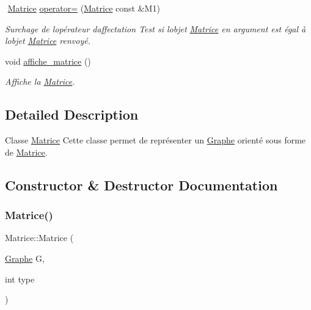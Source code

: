 \begin{DoxyCompactItemize}
$$\mbox{\label{classMatrice_a7cad6679749d80d4aa3771bd3864aeb8}} 
\hyperlink{classMatrice}{Matrice} \hyperlink{classMatrice_a7cad6679749d80d4aa3771bd3864aeb8}{operator=} (\hyperlink{classMatrice}{Matrice} const \&M1)
\begin{DoxyCompactList}\small\item\em Surchage de l\textquotesingle{}op\'{e}rateur d\textquotesingle{}affectation Test si l\textquotesingle{}objet \hyperlink{classMatrice}{Matrice} en argument est \'{e}gal \`{a} l\textquotesingle{}objet \hyperlink{classMatrice}{Matrice} renvoy\'{e}. \end{DoxyCompactList}\item 
\mbox{\label{classMatrice_a8d927d4f8245a16985e3cec9a1b46d8d}} 
void \hyperlink{classMatrice_a8d927d4f8245a16985e3cec9a1b46d8d}{affiche\+\_\+matrice} ()
\begin{DoxyCompactList}\small\item\em Affiche la \hyperlink{classMatrice}{Matrice}. \end{DoxyCompactList}\end{DoxyCompactItemize}


\subsection{Detailed Description}
Classe \hyperlink{classMatrice}{Matrice} Cette classe permet de repr\'{e}senter un \hyperlink{classGraphe}{Graphe} orienté sous forme de \hyperlink{classMatrice}{Matrice}. 

\subsection{Constructor \& Destructor Documentation}
\mbox{\label{classMatrice_a08fcadca16c80a3b442a2960a7944732}} 
\subsubsection{\texorpdfstring{Matrice()}{Matrice()}\hspace{0.1cm}{\footnotesize\ttfamily [1/4]}}
{\footnotesize\ttfamily Matrice\+::\+Matrice (\begin{DoxyParamCaption}\item[{\hyperlink{classGraphe}{Graphe}}]{G,  }\item[{int}]{type }\end{DoxyParamCaption})}



